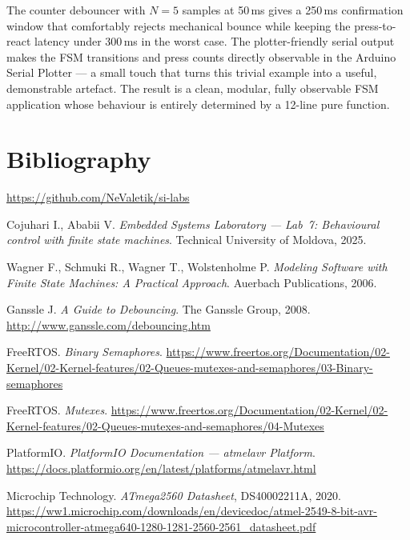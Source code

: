 \documentclass[12pt]{article}
\begin{document}
\hspace{0.8cm}
The counter debouncer with $N = 5$ samples at 50\,ms gives a 250\,ms confirmation window that comfortably rejects mechanical bounce while keeping the press-to-react latency under 300\,ms in the worst case. The plotter-friendly serial output makes the FSM transitions and press counts directly observable in the Arduino Serial Plotter --- a small touch that turns this trivial example into a useful, demonstrable artefact. The result is a clean, modular, fully observable FSM application whose behaviour is entirely determined by a 12-line pure function.

\section{Bibliography}

\begingroup
\makeatletter
\renewcommand{\section}[2]{}
\makeatother

\begin{thebibliography}{}

  \url{https://github.com/NeValetik/si-labs}

  Cojuhari I., Ababii V. \textit{Embedded Systems Laboratory --- Lab~7: Behavioural control with finite state machines}.
  Technical University of Moldova, 2025.

  Wagner F., Schmuki R., Wagner T., Wolstenholme P. \textit{Modeling Software with Finite State Machines: A Practical Approach}.
  Auerbach Publications, 2006.

  Ganssle J. \textit{A Guide to Debouncing}.
  The Ganssle Group, 2008.
  \url{http://www.ganssle.com/debouncing.htm}

  FreeRTOS. \textit{Binary Semaphores}.
  \url{https://www.freertos.org/Documentation/02-Kernel/02-Kernel-features/02-Queues-mutexes-and-semaphores/03-Binary-semaphores}

  FreeRTOS. \textit{Mutexes}.
  \url{https://www.freertos.org/Documentation/02-Kernel/02-Kernel-features/02-Queues-mutexes-and-semaphores/04-Mutexes}

  PlatformIO. \textit{PlatformIO Documentation --- atmelavr Platform}.
  \url{https://docs.platformio.org/en/latest/platforms/atmelavr.html}

  Microchip Technology. \textit{ATmega2560 Datasheet}, DS40002211A, 2020.
  \url{https://ww1.microchip.com/downloads/en/devicedoc/atmel-2549-8-bit-avr-microcontroller-atmega640-1280-1281-2560-2561_datasheet.pdf}

\end{thebibliography}
\endgroup

\pagebreak
\end{document}
